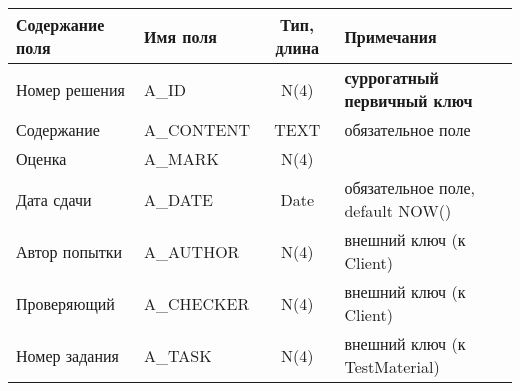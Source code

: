 \documentclass[a4paper,14pt]{article}
\begin{document}
\begin{table}[H]
	\begin{flushleft} 
	\end{flushleft}
	\begin{adjustbox}{width=\linewidth}
		\begin{tabular}{|l|l|c|l|}
			\hline
			Содержание поля & Имя поля   & Тип, длина & Примечания                          \\ \hline
			Номер решения   & A\_ID      &    N(4)    & \textbf{суррогатный первичный ключ} \\ \hline
			Содержание      & A\_CONTENT &    TEXT    & обязательное поле                   \\ \hline
			Оценка          & A\_MARK    &    N(4)    &                                     \\ \hline
			Дата сдачи      & A\_DATE    &    Date    & обязательное поле, default NOW()    \\ \hline
			Автор попытки   & A\_AUTHOR  &    N(4)    & внешний ключ (к Client)               \\ \hline
			Проверяющий     & A\_CHECKER &    N(4)    & внешний ключ (к Client)               \\ \hline
			Номер задания   & A\_TASK    &    N(4)    & внешний ключ (к TestMaterial)       \\ \hline
		\end{tabular}
	\end{adjustbox}
\end{table}

\end{document}

